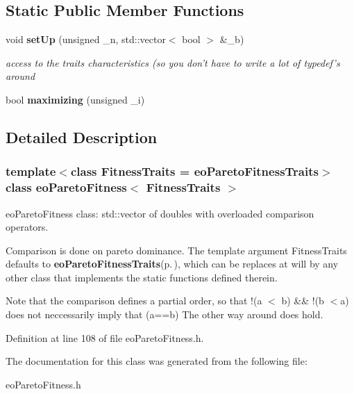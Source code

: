 \subsection*{Static Public Member Functions}
\begin{CompactItemize}
\item 
void {\bf set\-Up} (unsigned \_\-n, std::vector$<$ bool $>$ \&\_\-b)\label{classeo_pareto_fitness_e0}

\begin{CompactList}\small\item\em access to the traits characteristics (so you don't have to write a lot of typedef's around \item\end{CompactList}\item 
bool {\bf maximizing} (unsigned \_\-i)\label{classeo_pareto_fitness_e1}

\end{CompactItemize}


\subsection{Detailed Description}
\subsubsection*{template$<$class Fitness\-Traits = eo\-Pareto\-Fitness\-Traits$>$ class eo\-Pareto\-Fitness$<$ Fitness\-Traits $>$}

eo\-Pareto\-Fitness class: std::vector of doubles with overloaded comparison operators. 

Comparison is done on pareto dominance. The template argument Fitness\-Traits defaults to {\bf eo\-Pareto\-Fitness\-Traits}{\rm (p.\,\pageref{classeo_pareto_fitness_traits})}, which can be replaces at will by any other class that implements the static functions defined therein.

Note that the comparison defines a partial order, so that !(a $<$ b) \&\& !(b $<$a) does not neccessarily imply that (a==b) The other way around does hold. 



Definition at line 108 of file eo\-Pareto\-Fitness.h.

The documentation for this class was generated from the following file:\begin{CompactItemize}
\item 
eo\-Pareto\-Fitness.h\end{CompactItemize}
